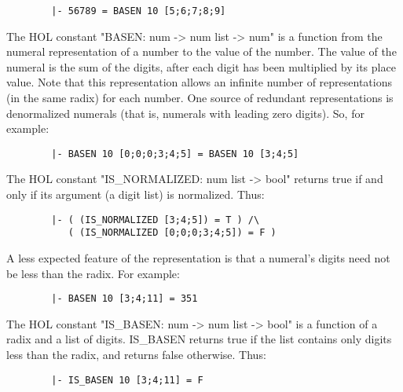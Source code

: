 \begin{hol}\begin{verbatim}
        |- 56789 = BASEN 10 [5;6;7;8;9]
\end{verbatim}\end{hol}

The HOL constant {\ml "BASEN: num -> num list -> num"} is a function from the
numeral representation of a number to the value of the number.  The value of
the numeral is the sum of the digits, after each digit has been multiplied by
its place value.  Note that this representation allows an infinite number of
representations (in the same radix) for each number.  One source of redundant
representations is denormalized numerals (that is, numerals with leading zero
digits).  So, for example:

\begin{hol}\begin{verbatim}
        |- BASEN 10 [0;0;0;3;4;5] = BASEN 10 [3;4;5]
\end{verbatim}\end{hol}

The HOL constant {\ml "IS\_NORMALIZED: num list -> bool"} returns true if and
only if its argument (a digit list) is normalized.  Thus:

\begin{hol}\begin{verbatim}
        |- ( (IS_NORMALIZED [3;4;5]) = T ) /\
           ( (IS_NORMALIZED [0;0;0;3;4;5]) = F )
\end{verbatim}\end{hol}

A less expected feature of the representation is that a numeral's digits need
not be less than the radix.  For example:

\begin{hol}\begin{verbatim}
        |- BASEN 10 [3;4;11] = 351
\end{verbatim}\end{hol}

The HOL constant {\ml "IS\_BASEN: num -> num list -> bool"} is a function of a
radix and a list of digits.  {\ml IS\_BASEN} returns true if the list contains
only digits less than the radix, and returns false otherwise.  Thus:

\begin{hol}\begin{verbatim}
        |- IS_BASEN 10 [3;4;11] = F
\end{verbatim}\end{hol}

